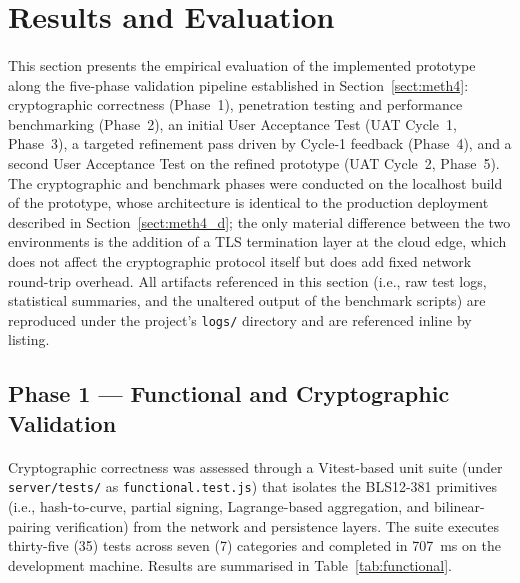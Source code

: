 \section{Results and Evaluation}
\label{header:results}

\paragraph{}This section presents the empirical evaluation of the implemented prototype along the five-phase validation pipeline established in Section~\ref{sect:meth4}: cryptographic correctness (Phase~1), penetration testing and performance benchmarking (Phase~2), an initial User Acceptance Test (UAT Cycle~1, Phase~3), a targeted refinement pass driven by Cycle-1 feedback (Phase~4), and a second User Acceptance Test on the refined prototype (UAT Cycle~2, Phase~5). The cryptographic and benchmark phases were conducted on the localhost build of the prototype, whose architecture is identical to the production deployment described in Section~\ref{sect:meth4_d}; the only material difference between the two environments is the addition of a TLS termination layer at the cloud edge, which does not affect the cryptographic protocol itself but does add fixed network round-trip overhead. All artifacts referenced in this section (i.e., raw test logs, statistical summaries, and the unaltered output of the benchmark scripts) are reproduced under the project's \texttt{logs/} directory and are referenced inline by listing.

\subsection{Phase 1 --- Functional and Cryptographic Validation}
\label{sect:results_func}

\paragraph{}Cryptographic correctness was assessed through a Vitest-based unit suite (under \texttt{server/tests/} as \texttt{functional.test.js}) that isolates the BLS12-381 primitives (i.e., hash-to-curve, partial signing, Lagrange-based aggregation, and bilinear-pairing verification) from the network and persistence layers. The suite executes thirty-five (35) tests across seven (7) categories and completed in 707~ms on the development machine. Results are summarised in Table~\ref{tab:functional}.

